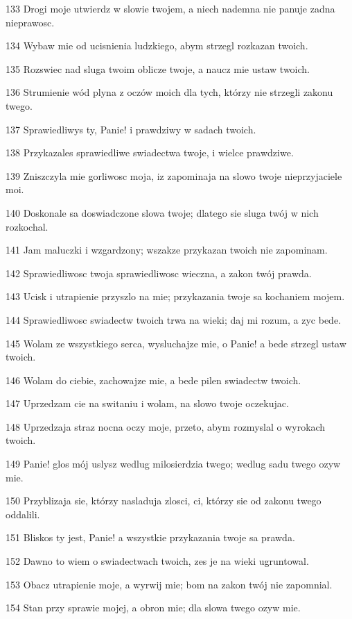\par 133 Drogi moje utwierdz w slowie twojem, a niech nademna nie panuje zadna nieprawosc.
\par 134 Wybaw mie od ucisnienia ludzkiego, abym strzegl rozkazan twoich.
\par 135 Rozswiec nad sluga twoim oblicze twoje, a naucz mie ustaw twoich.
\par 136 Strumienie wód plyna z oczów moich dla tych, którzy nie strzegli zakonu twego.
\par 137 Sprawiedliwys ty, Panie! i prawdziwy w sadach twoich.
\par 138 Przykazales sprawiedliwe swiadectwa twoje, i wielce prawdziwe.
\par 139 Zniszczyla mie gorliwosc moja, iz zapominaja na slowo twoje nieprzyjaciele moi.
\par 140 Doskonale sa doswiadczone slowa twoje; dlatego sie sluga twój w nich rozkochal.
\par 141 Jam maluczki i wzgardzony; wszakze przykazan twoich nie zapominam.
\par 142 Sprawiedliwosc twoja sprawiedliwosc wieczna, a zakon twój prawda.
\par 143 Ucisk i utrapienie przyszlo na mie; przykazania twoje sa kochaniem mojem.
\par 144 Sprawiedliwosc swiadectw twoich trwa na wieki; daj mi rozum, a zyc bede.
\par 145 Wolam ze wszystkiego serca, wysluchajze mie, o Panie! a bede strzegl ustaw twoich.
\par 146 Wolam do ciebie, zachowajze mie, a bede pilen swiadectw twoich.
\par 147 Uprzedzam cie na switaniu i wolam, na slowo twoje oczekujac.
\par 148 Uprzedzaja straz nocna oczy moje, przeto, abym rozmyslal o wyrokach twoich.
\par 149 Panie! glos mój uslysz wedlug milosierdzia twego; wedlug sadu twego ozyw mie.
\par 150 Przyblizaja sie, którzy nasladuja zlosci, ci, którzy sie od zakonu twego oddalili.
\par 151 Bliskos ty jest, Panie! a wszystkie przykazania twoje sa prawda.
\par 152 Dawno to wiem o swiadectwach twoich, zes je na wieki ugruntowal.
\par 153 Obacz utrapienie moje, a wyrwij mie; bom na zakon twój nie zapomnial.
\par 154 Stan przy sprawie mojej, a obron mie; dla slowa twego ozyw mie.

